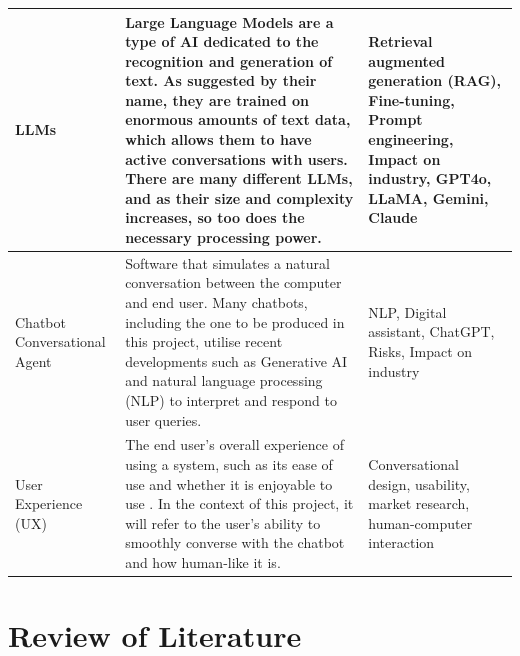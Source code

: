 \documentclass[12pt]{report}
\begin{document}
\begin{table}[H]
\begin{tabular}{|p{}|p{} | p{}|}
            \\

            \hline
            
            LLMs & Large Language Models are a type of AI dedicated to the recognition and generation of text.
            As suggested by their name, they are trained on enormous amounts of text data, which allows them 
            to have active conversations with users. There are many different LLMs, and as their size and 
            complexity increases, so too does the necessary processing power. &
            Retrieval augmented generation (RAG), Fine-tuning, Prompt engineering, Impact on industry,
            GPT4o, LLaMA, Gemini, Claude
            
            \\

            \hline
            Chatbot \newline Conversational Agent & Software that simulates a natural conversation between the 
            computer and end user. Many chatbots, including the one to be produced in this project, utilise recent
            developments such as Generative AI and natural language processing (NLP) to interpret and respond to user queries.
            \autocite{IBMChatbotDef}
            & NLP, Digital assistant, ChatGPT, Risks, Impact on industry \\

            \hline 

            User Experience (UX) & The end user's overall experience of using a system, such as its ease of use and 
            whether it is enjoyable to use \autocite{UXDict}. In the context of this project, it will refer to the user's 
            ability to smoothly converse with the chatbot and how human-like it is. 
            & Conversational design, usability, market research, human-computer interaction

            \\

            \hline 

        \end{tabular}\label{tab:themes}
    \end{table}


    \pagebreak %

    \section{Review of Literature}
\end{document}
